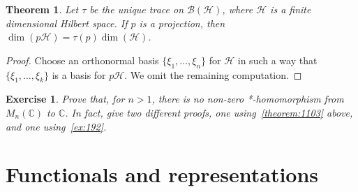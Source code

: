 \documentclass{book}
\newtheorem{exercise}{Exercise}[section]
\newtheorem{theorem}[definition]{Theorem}
\begin{document}
\begin{theorem}
  Let \(\tau\) be the unique trace on \(\mathcal{B}(\mathcal{H})\), where \(\mathcal{H}\) is a finite
  dimensional Hilbert space. If \(p\) is a projection, then \(\dim(p\mathcal{H}) = \tau(p)\dim(\mathcal{H})\).
\end{theorem}
\begin{proof}
  Choose an orthonormal basis \(\{\xi_1,\ldots,\xi_n\}\) for \(\mathcal{H}\) in such a way that
  \(\{\xi_1,\ldots,\xi_k\}\) is a basis for \(p\mathcal{H}\). We omit the remaining computation.
\end{proof}
\begin{exercise}
  Prove that, for \(n > 1\), there is no non-zero
  *-homomorphism from \(M_n(\mathbb{C})\) to \(\mathbb{C}\). In fact, give two different proofs, one
  using~\ref{theorem:1103} above, and one using~\ref{ex:192}.
\end{exercise}

\chapter{Functionals and representations}\label{Petersen:chapter3}
\end{document}
